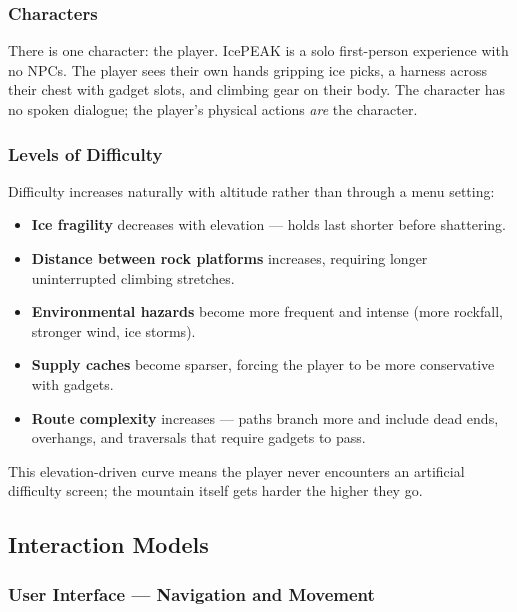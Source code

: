 \documentclass[12pt]{article}
\begin{document}

\subsubsection{Characters}

There is one character: the player. IcePEAK is a solo first-person experience with no NPCs. The player sees their own hands gripping ice picks, a harness across their chest with gadget slots, and climbing gear on their body. The character has no spoken dialogue; the player's physical actions \emph{are} the character.


\subsubsection{Levels of Difficulty}

Difficulty increases naturally with altitude rather than through a menu setting:

\begin{itemize}[leftmargin=2em]
    \item \textbf{Ice fragility} decreases with elevation --- holds last shorter before shattering.
    \item \textbf{Distance between rock platforms} increases, requiring longer uninterrupted climbing stretches.
    \item \textbf{Environmental hazards} become more frequent and intense (more rockfall, stronger wind, ice storms).
    \item \textbf{Supply caches} become sparser, forcing the player to be more conservative with gadgets.
    \item \textbf{Route complexity} increases --- paths branch more and include dead ends, overhangs, and traversals that require gadgets to pass.
\end{itemize}

This elevation-driven curve means the player never encounters an artificial difficulty screen; the mountain itself gets harder the higher they go.

\subsection{Interaction Models}

\subsubsection{User Interface --- Navigation and Movement}
\end{document}
